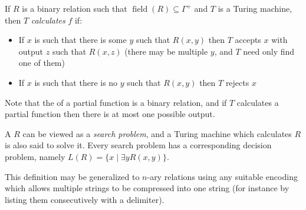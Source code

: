 \documentclass[12pt]{article}
\begin{document}
If $R$ is a binary relation such that $\operatorname{field}(R)\subseteq\Gamma^+$ and $T$ is a Turing machine, then $T$ \emph{calculates} $f$ if:

\begin{itemize}
\item If $x$ is such that there is some $y$ such that $R(x,y)$ then $T$ accepts $x$ with output $z$ such that $R(x,z)$ (there may be multiple $y$, and $T$ need only find one of them)

\item If $x$ is such that there is no $y$ such that $R(x,y)$ then $T$ rejects $x$
\end{itemize}

Note that the  of a partial function is a binary relation, and if $T$ calculates a partial function then there is at most one possible output.

A  $R$ can be viewed as a \emph{search problem}, and a Turing machine which calculates $R$ is also said to solve it.  Every search problem has a corresponding decision problem, namely $L(R)=\{x\mid \exists y R(x,y)\}$.

This definition may be generalized to $n$-ary relations using any suitable encoding which allows multiple strings to be compressed into one string (for instance by listing them consecutively with a delimiter).
\end{document}
